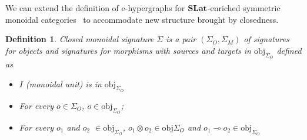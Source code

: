 \documentclass[acmsmall, screen, nonacm]{acmart}
\newtheorem{definition}[theorem]{Definition}
\begin{document}
We can extend the definition of e-hypergraphs for $\mathbf{SLat}$-enriched symmetric monoidal categories~\cite{tiurin2025equivalencehypergraphsdporewriting} to accommodate new structure brought by closedness.

\begin{definition}
Closed monoidal signature $\Sigma$ is a pair $(\Sigma_{O},\Sigma_{M})$ of signatures for objects and signatures for morphisms with sources and targets in $\text{obj}_{\Sigma_{O}}$ defined as
\begin{itemize}
  \item $I$ (monoidal unit) is in $\text{obj}_{\Sigma_{O}}$
  \item For every $o \in \Sigma_{O}$, $o \in \text{obj}_{\Sigma_{O}}$;
  \item For every $o_1$ and $o_2$ $ \in \text{obj}_{\Sigma_{O}}$, $o_1 \otimes o_2 \in \text{obj}{\Sigma_{O}}$ and $o_1 \multimap o_2 \in \text{obj}_{\Sigma_{O}}$
\end{itemize}
\end{definition}
\end{document}
